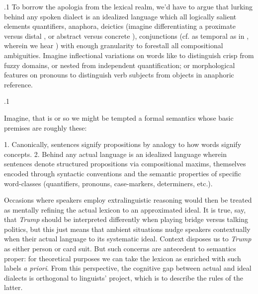 \documentclass[11pt, twocolumn]{article}
\begin{document}
\p.1{%
To borrow the apologia from the lexical realm, we'd have to argue that
lurking behind any spoken dialect is an idealized language
which \pgl{} all logically salient elements \mdash{} quantifiers, anaphora, deictics
(imagine differentiating a proximate versus distal , or abstract versus concrete
),
conjunctions (cf.  as temporal as in ,
wherein we hear ) \mdash{} with enough granularity to forestall
all compositional ambiguities. Imagine inflectional variations
on words like  to distinguish crisp from fuzzy domains, or nested from
independent quantification; or morphological features on pronouns to
distinguish verb subjects from objects in anaphoric reference.
}%

\p.1{%
Imagine, that is \mdash{} or so we might be tempted \mdash{} a formal semantics whose basic premises are roughly these: \vspace{-22pt}

\begin{docEnumerate}
1. Canonically, sentences signify propositions \mdash{} by analogy to how words signify concepts.
 2. Behind any actual language is an idealized language wherein sentences denote
structured propositions via compositional maxims, themselves encoded through
syntactic conventions and the semantic properties of specific word-classes
(quantifiers, pronouns, case-markers, determiners, etc.).

\end{docEnumerate}

\nip{}%
Occasions where speakers employ extralinguistic reasoning
would then be treated as mentally refining the
actual lexicon to an approximated ideal.
It is true, say, that \textit{Trump} should be interpreted differently
when playing bridge versus talking politics, but this just means that
ambient situations nudge speakers contextually when 
their actual language to its systematic ideal. Context
disposes us to  \textit{Trump} as either person or card
suit. But such concerns are antecedent to semantics proper: for theoretical
purposes we can take the lexicon as enriched with such labels \textit{a priori}.
From this perspective, the cognitive gap between
actual and ideal dialects is orthogonal to linguists'
project, which is to describe the rules of the latter.
}%
\end{document}
